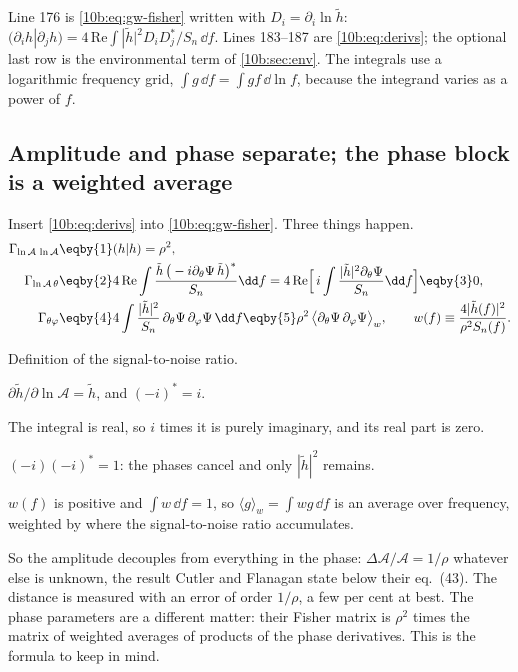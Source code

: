 
\noindent Line 176 is \eqref{10b:eq:gw-fisher} written with $D_i=\partial_i\ln\tilde h$:
$(\partial_ih|\partial_jh)=4\,\mathrm{Re}\int|\tilde h|^2D_iD_j^*/S_n\,\dd f$. Lines 183--187 are
\eqref{10b:eq:derivs}; the optional last row is the environmental term of \cref{10b:sec:env}. The integrals use a
logarithmic frequency grid, $\int g\,\dd f=\int gf\,\dd\ln f$, because the integrand varies as a power of $f$.

\subsection{Amplitude and phase separate; the phase block is a weighted average}
\label{10b:sec:fisher-structure}

Insert \eqref{10b:eq:derivs} into \eqref{10b:eq:gw-fisher}. Three things happen.
\begin{align}
  \Gamma_{\ln\mathcal A\,\ln\mathcal A}
  &\eqby{1}(h|h)=\rho^2,\nonumber\\
  \Gamma_{\ln\mathcal A\,\theta}
  &\eqby{2}4\,\mathrm{Re}\int\frac{\tilde h\,\big(-i\partial_\theta\Psi\,\tilde h\big)^*}{S_n}\dd f
   =4\,\mathrm{Re}\Big[\,i\int\frac{|\tilde h|^2\partial_\theta\Psi}{S_n}\dd f\Big]\eqby{3}0,\nonumber\\
  \Gamma_{\theta\varphi}
  &\eqby{4}4\int\frac{|\tilde h|^2}{S_n}\,\partial_\theta\Psi\,\partial_\varphi\Psi\,\dd f
   \eqby{5}\rho^2\,\big\langle\partial_\theta\Psi\,\partial_\varphi\Psi\big\rangle_w,
   \qquad w(f)\equiv\frac{4|\tilde h(f)|^2}{\rho^2S_n(f)} .
  \label{10b:eq:fisher-blocks}
\end{align}
\begin{explain}
  \item Definition of the signal-to-noise ratio.
  \item $\partial\tilde h/\partial\ln\mathcal A=\tilde h$, and $(-i)^*=i$.
  \item The integral is real, so $i$ times it is purely imaginary, and its real part is zero.
  \item $(-i)(-i)^*=1$: the phases cancel and only $|\tilde h|^2$ remains.
  \item $w(f)$ is positive and $\int w\,\dd f=1$, so $\langle g\rangle_w=\int wg\,\dd f$ is an average over
        frequency, weighted by where the signal-to-noise ratio accumulates.
\end{explain}
So the amplitude decouples from everything in the phase: $\Delta\mathcal A/\mathcal A=1/\rho$ whatever else is
unknown, the result Cutler and Flanagan state below their eq.~(43). The distance is measured with an error of order
$1/\rho$, a few per cent at best. The phase parameters are a different matter: their Fisher matrix is $\rho^2$ times
the matrix of weighted averages of products of the phase derivatives. This is the formula to keep in mind.

